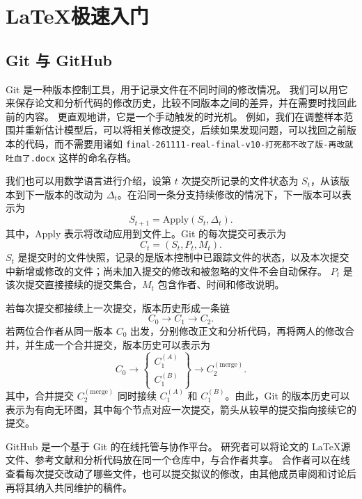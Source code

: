 \section[\LaTeX 极速入门]{\LaTeX 极速入门\protect\footnotemark}
\label{sec:use}

\subsection{Git 与 GitHub}
\label{sec:github}

Git 是一种版本控制工具，用于记录文件在不同时间的修改情况。
我们可以用它来保存论文和分析代码的修改历史，比较不同版本之间的差异，并在需要时找回此前的内容。
更直观地讲，它是一个手动触发的时光机。
例如，我们在调整样本范围并重新估计模型后，可以将相关修改提交，后续如果发现问题，可以找回之前版本的代码，而不需要用诸如 \texttt{final-261111-real-final-v10-打死都不改了版-再改就吐血了.docx} 这样的命名存档。

我们也可以用数学语言进行介绍，设第 $t$ 次提交所记录的文件状态为 $S_t$，从该版本到下一版本的改动为 $\Delta_t$。在沿同一条分支持续修改的情况下，下一版本可以表示为
\[
    S_{t+1} = \mathrm{Apply}(S_t, \Delta_t).
\]
其中，$\mathrm{Apply}$ 表示将改动应用到文件上。Git 的每次提交可表示为
\[
    C_t = (S_t, P_t, M_t).
\]
$S_t$ 是提交时的文件快照，记录的是版本控制中已跟踪文件的状态，以及本次提交中新增或修改的文件；尚未加入提交的修改和被忽略的文件不会自动保存。
$P_t$ 是该次提交直接接续的提交集合，$M_t$ 包含作者、时间和修改说明。

若每次提交都接续上一次提交，版本历史形成一条链
\[
    C_0 \longrightarrow C_1 \longrightarrow C_2.
\]
若两位合作者从同一版本 $C_0$ 出发，分别修改正文和分析代码，再将两人的修改合并，并生成一个合并提交，版本历史可以表示为
\[
    C_0 \longrightarrow
    \left\{
    \begin{array}{l}
        C_1^{(A)} \\
        C_1^{(B)}
    \end{array}
    \right\}
    \longrightarrow C_2^{(\mathrm{merge})}.
\]
其中，合并提交 $C_2^{(\mathrm{merge})}$ 同时接续 $C_1^{(A)}$ 和 $C_1^{(B)}$。由此，Git 的版本历史可以表示为有向无环图，其中每个节点对应一次提交，箭头从较早的提交指向接续它的提交。

GitHub 是一个基于 Git 的在线托管与协作平台。
研究者可以将论文的 \LaTeX 源文件、参考文献和分析代码放在同一个仓库中，与合作者共享。
合作者可以在线查看每次提交改动了哪些文件，也可以提交拟议的修改，由其他成员审阅和讨论后再将其纳入共同维护的稿件。

